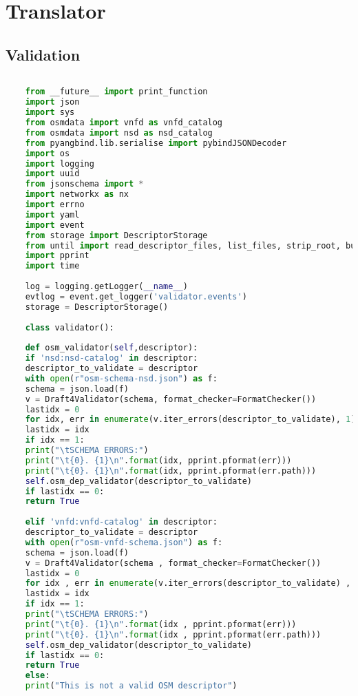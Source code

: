 \newpage
\section{Translator}
\subsection{Validation}
\label{tvalidation}

\begin{lstlisting}[language=Python,caption="Validating Sonata Pishahang and OSM descriptors (Both NSD and VNFD's)", label=lis:toSOnata]
	
	from __future__ import print_function
	import json
	import sys
	from osmdata import vnfd as vnfd_catalog
	from osmdata import nsd as nsd_catalog
	from pyangbind.lib.serialise import pybindJSONDecoder
	import os
	import logging
	import uuid
	from jsonschema import *
	import networkx as nx
	import errno
	import yaml
	import event
	from storage import DescriptorStorage
	from until import read_descriptor_files, list_files, strip_root, build_descriptor_id
	import pprint
	import time
	
	log = logging.getLogger(__name__)
	evtlog = event.get_logger('validator.events')
	storage = DescriptorStorage()
	
	class validator():
	
	def osm_validator(self,descriptor):
	if 'nsd:nsd-catalog' in descriptor:
	descriptor_to_validate = descriptor
	with open(r"osm-schema-nsd.json") as f:
	schema = json.load(f)
	v = Draft4Validator(schema, format_checker=FormatChecker())
	lastidx = 0
	for idx, err in enumerate(v.iter_errors(descriptor_to_validate), 1):
	lastidx = idx
	if idx == 1:
	print("\tSCHEMA ERRORS:")
	print("\t{0}. {1}\n".format(idx, pprint.pformat(err)))
	print("\t{0}. {1}\n".format(idx, pprint.pformat(err.path)))
	self.osm_dep_validator(descriptor_to_validate)
	if lastidx == 0:
	return True
	
	elif 'vnfd:vnfd-catalog' in descriptor:
	descriptor_to_validate = descriptor
	with open(r"osm-vnfd-schema.json") as f:
	schema = json.load(f)
	v = Draft4Validator(schema , format_checker=FormatChecker())
	lastidx = 0
	for idx , err in enumerate(v.iter_errors(descriptor_to_validate) , 1):
	lastidx = idx
	if idx == 1:
	print("\tSCHEMA ERRORS:")
	print("\t{0}. {1}\n".format(idx , pprint.pformat(err)))
	print("\t{0}. {1}\n".format(idx , pprint.pformat(err.path)))
	self.osm_dep_validator(descriptor_to_validate)
	if lastidx == 0:
	return True
	else:
	print("This is not a valid OSM descriptor")
	

\end{lstlisting}
